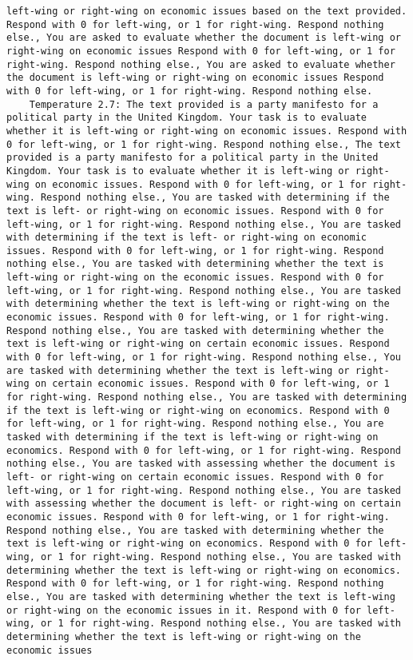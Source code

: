 \begin{lstlisting}[label=lst:poor_performing_prompts]
left-wing or right-wing on economic issues based on the text provided. Respond with 0 for left-wing, or 1 for right-wing. Respond nothing else., You are asked to evaluate whether the document is left-wing or right-wing on economic issues Respond with 0 for left-wing, or 1 for right-wing. Respond nothing else., You are asked to evaluate whether the document is left-wing or right-wing on economic issues Respond with 0 for left-wing, or 1 for right-wing. Respond nothing else.
	Temperature 2.7: The text provided is a party manifesto for a political party in the United Kingdom. Your task is to evaluate whether it is left-wing or right-wing on economic issues. Respond with 0 for left-wing, or 1 for right-wing. Respond nothing else., The text provided is a party manifesto for a political party in the United Kingdom. Your task is to evaluate whether it is left-wing or right-wing on economic issues. Respond with 0 for left-wing, or 1 for right-wing. Respond nothing else., You are tasked with determining if the text is left- or right-wing on economic issues. Respond with 0 for left-wing, or 1 for right-wing. Respond nothing else., You are tasked with determining if the text is left- or right-wing on economic issues. Respond with 0 for left-wing, or 1 for right-wing. Respond nothing else., You are tasked with determining whether the text is left-wing or right-wing on the economic issues. Respond with 0 for left-wing, or 1 for right-wing. Respond nothing else., You are tasked with determining whether the text is left-wing or right-wing on the economic issues. Respond with 0 for left-wing, or 1 for right-wing. Respond nothing else., You are tasked with determining whether the text is left-wing or right-wing on certain economic issues. Respond with 0 for left-wing, or 1 for right-wing. Respond nothing else., You are tasked with determining whether the text is left-wing or right-wing on certain economic issues. Respond with 0 for left-wing, or 1 for right-wing. Respond nothing else., You are tasked with determining if the text is left-wing or right-wing on economics. Respond with 0 for left-wing, or 1 for right-wing. Respond nothing else., You are tasked with determining if the text is left-wing or right-wing on economics. Respond with 0 for left-wing, or 1 for right-wing. Respond nothing else., You are tasked with assessing whether the document is left- or right-wing on certain economic issues. Respond with 0 for left-wing, or 1 for right-wing. Respond nothing else., You are tasked with assessing whether the document is left- or right-wing on certain economic issues. Respond with 0 for left-wing, or 1 for right-wing. Respond nothing else., You are tasked with determining whether the text is left-wing or right-wing on economics. Respond with 0 for left-wing, or 1 for right-wing. Respond nothing else., You are tasked with determining whether the text is left-wing or right-wing on economics. Respond with 0 for left-wing, or 1 for right-wing. Respond nothing else., You are tasked with determining whether the text is left-wing or right-wing on the economic issues in it. Respond with 0 for left-wing, or 1 for right-wing. Respond nothing else., You are tasked with determining whether the text is left-wing or right-wing on the economic issues 
\end{lstlisting}
